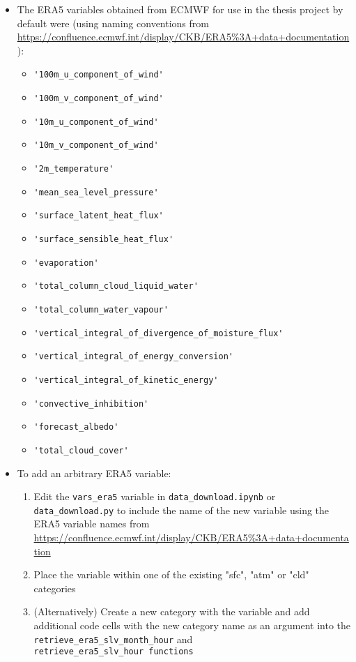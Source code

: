 \begin{itemize}
	\item The ERA5 variables obtained from ECMWF for use in the thesis project by default were (using naming conventions from \url{https://confluence.ecmwf.int/display/CKB/ERA5%3A+data+documentation}):
		\begin{itemize}
			\item \verb+'100m_u_component_of_wind'+
			\item \verb+'100m_v_component_of_wind'+
			\item \verb+'10m_u_component_of_wind'+
			\item \verb+'10m_v_component_of_wind'+
			\item \verb+'2m_temperature'+
			\item \verb+'mean_sea_level_pressure'+
			\item \verb+'surface_latent_heat_flux'+
			\item \verb+'surface_sensible_heat_flux'+
			\item \verb+'evaporation'+
			\item \verb+'total_column_cloud_liquid_water'+
			\item \verb+'total_column_water_vapour'+
			\item \verb+'vertical_integral_of_divergence_of_moisture_flux'+
			\item \verb+'vertical_integral_of_energy_conversion'+
			\item \verb+'vertical_integral_of_kinetic_energy'+
			\item \verb+'convective_inhibition'+
			\item \verb+'forecast_albedo'+
			\item \verb+'total_cloud_cover'+
		\end{itemize}
	\item To add an arbitrary ERA5 variable:
	\begin{enumerate}
		\item Edit the \verb+vars_era5+ variable in \verb+data_download.ipynb+ or \\ \verb+data_download.py+ to include the name of the new variable using the ERA5 variable names from \url{https://confluence.ecmwf.int/display/CKB/ERA5%3A+data+documentation}
		\item Place the variable within one of the existing "sfc", "atm" or "cld" categories
		\item (Alternatively) Create a new category with the variable and add additional code cells with the new category name as an argument into the \\ \verb+retrieve_era5_slv_month_hour+ and \\ \verb+retrieve_era5_slv_hour functions+

\end{enumerate}
\end{itemize}
